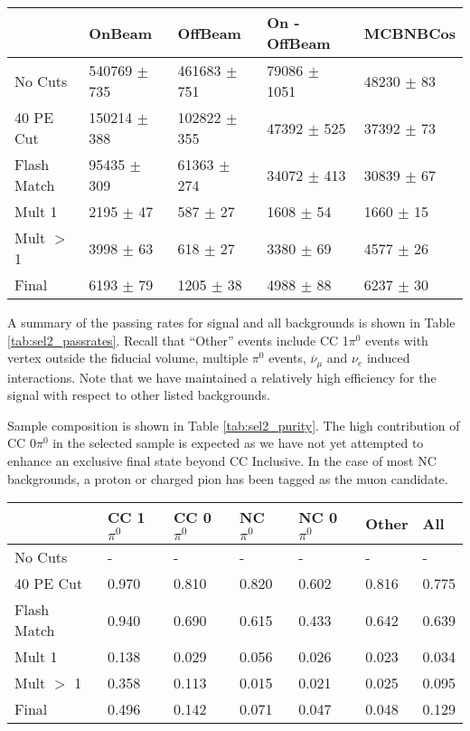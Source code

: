 \documentclass{article}
\begin{document}
\begin{table*} 
 \centering
 \begin{tabular}{| l | l | l | l | l |}
  \hline
   & OnBeam & OffBeam & On - OffBeam & MCBNBCos \\ [0.1ex] \hline
No Cuts & 540769 $\pm$ 735 & 461683 $\pm$ 751 & 79086 $\pm$ 1051 & 48230 $\pm$ 83 \\ 
40 PE Cut & 150214 $\pm$ 388 & 102822 $\pm$ 355 & 47392 $\pm$ 525 & 37392 $\pm$ 73  \\ 
Flash Match & 95435 $\pm$ 309 & 61363 $\pm$ 274 & 34072 $\pm$ 413 & 30839 $\pm$ 67 \\ \hline
Mult 1 & 2195 $\pm$ 47 & 587 $\pm$ 27 & 1608 $\pm$ 54  & 1660 $\pm$ 15  \\ 
Mult $>$ 1 & 3998 $\pm$ 63  & 618 $\pm$ 27 & 3380 $\pm$ 69 & 4577 $\pm$ 26 \\ 
Final & 6193 $\pm$ 79 & 1205 $\pm$ 38 & 4988 $\pm$ 88 & 6237 $\pm$ 30  \\ \hline
 \end{tabular}
 \end{table*}

\par A summary of the passing rates for signal and all backgrounds is shown in Table \ref{tab:sel2_passrates}.  Recall that ``Other'' events include CC 1$\pi^0$ events with vertex outside the fiducial volume, multiple $\pi^0$ events, $\overline{\nu}_\mu$ and $\nu_e$ induced interactions.  Note that we have maintained a relatively high efficiency for the signal with respect to other listed backgrounds.  
\par Sample composition is shown in Table \ref{tab:sel2_purity}. The high contribution of CC 0$\pi^0$ in the selected sample is expected as we have not yet attempted to enhance an exclusive final state beyond CC Inclusive. In the case of most NC backgrounds, a proton or charged pion has been tagged as the muon candidate.

\begin{table*}
\centering
{}
 \begin{tabular}{| l | l | l |l|l|l|l|}
 \hline
 & CC 1$\pi^0$ & CC 0$\pi^0$ & NC $\pi^0$ & NC 0$\pi^0$ & Other & All \\ [0.1ex] \hline
No Cuts & - & - & - & - & - & -\\
40 PE Cut & 0.970 & 0.810 & 0.820 & 0.602 & 0.816 & 0.775 \\ 
Flash Match & 0.940 & 0.690 & 0.615 & 0.433 & 0.642 & 0.639 \\ \hline
Mult 1 & 0.138 & 0.029 & 0.056 & 0.026 & 0.023 & 0.034 \\ 
Mult $>$ 1 & 0.358 & 0.113 & 0.015 & 0.021 & 0.025 & 0.095 \\ 
Final & 0.496 & 0.142 & 0.071 & 0.047 & 0.048 & 0.129 \\ \hline
\end{tabular}
\end{table*}
\end{document}
